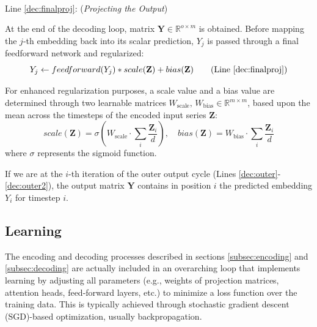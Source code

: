 \documentclass[algorithms,article,submit,pdftex,moreauthors]{Definitions/mdpi}
\begin{document}
~\\Line \ref{dec:finalproj}: (\textit{Projecting the Output})

\noindent At the end of the decoding loop, matrix $\textbf{Y} \in \mathbb{R}^{o \times m}$ is obtained.
Before mapping the $j$-th embedding back into its scalar prediction, $Y_j$ is passed through a final feedforward network and regularized:
\begin{equation}
    Y_j \leftarrow feedforward(Y_j) * scale(\textbf{Z}) + bias(\textbf{Z})
    \tag{Line \ref{dec:finalproj}}
\end{equation}

For enhanced regularization purposes, a scale value and a bias value are determined through two learnable matrices $W_\text{scale},\,W_\text{bias} \in \mathbb{R}^{m \times m}$, based upon the mean across the timesteps of the encoded input series $\textbf{Z}$:
$$
    scale(\textbf{Z}) = \sigma\left(W_\text{scale} \cdot \sum_{i} \dfrac{\textbf{Z}_i}{d}\right), \quad bias(\textbf{Z}) = W_\text{bias} \cdot \sum_{i} \dfrac{\textbf{Z}_i}{d}
$$
where $\sigma$ represents the sigmoid function.

If we are at the $i$-th iteration of the outer output cycle (Lines \ref{dec:outer}-\ref{dec:outer2}), the output matrix $\textbf{Y}$ contains in position $i$ the predicted embedding $Y_i$ for timestep $i$.

\subsection{Learning} \label{subsec:learning}

The encoding and decoding processes described in sections \ref{subsec:encoding} and \ref{subsec:decoding} are actually included in an overarching loop that implements learning by adjusting all parameters (e.g., weights of projection matrices, attention heads, feed-forward layers, etc.) to minimize a loss function over the training data. This is typically achieved through stochastic gradient descent (SGD)-based optimization, usually backpropagation.
\end{document}
